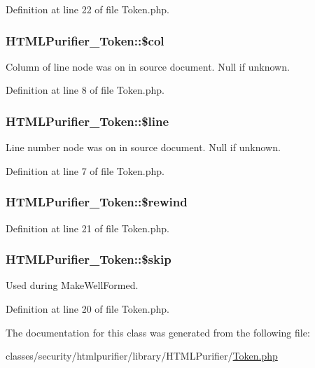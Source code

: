Definition at line 22 of file Token.\+php.

\hypertarget{classHTMLPurifier__Token_ae063b7efb1fb056d4abad981d5237a71}{
\subsubsection[{\$col}]{\setlength{\rightskip}{0pt plus 5cm}H\+T\+M\+L\+Purifier\+\_\+\+Token\+::\$col}}\label{classHTMLPurifier__Token_ae063b7efb1fb056d4abad981d5237a71}
Column of line node was on in source document. Null if unknown. 

Definition at line 8 of file Token.\+php.

\hypertarget{classHTMLPurifier__Token_a64cba5bdee6d525377b8fe33109122b4}{
\subsubsection[{\$line}]{\setlength{\rightskip}{0pt plus 5cm}H\+T\+M\+L\+Purifier\+\_\+\+Token\+::\$line}}\label{classHTMLPurifier__Token_a64cba5bdee6d525377b8fe33109122b4}
Line number node was on in source document. Null if unknown. 

Definition at line 7 of file Token.\+php.

\hypertarget{classHTMLPurifier__Token_ae6284c7aa38e04e9e2b117e2029ef8c3}{
\subsubsection[{\$rewind}]{\setlength{\rightskip}{0pt plus 5cm}H\+T\+M\+L\+Purifier\+\_\+\+Token\+::\$rewind}}\label{classHTMLPurifier__Token_ae6284c7aa38e04e9e2b117e2029ef8c3}


Definition at line 21 of file Token.\+php.

\hypertarget{classHTMLPurifier__Token_af7eba36dca16eab138ff7823444f2ca0}{
\subsubsection[{\$skip}]{\setlength{\rightskip}{0pt plus 5cm}H\+T\+M\+L\+Purifier\+\_\+\+Token\+::\$skip}}\label{classHTMLPurifier__Token_af7eba36dca16eab138ff7823444f2ca0}
Used during Make\+Well\+Formed. 

Definition at line 20 of file Token.\+php.



The documentation for this class was generated from the following file\+:\begin{DoxyCompactItemize}
\item 
classes/security/htmlpurifier/library/\+H\+T\+M\+L\+Purifier/\hyperlink{Token_8php}{Token.\+php}\end{DoxyCompactItemize}
